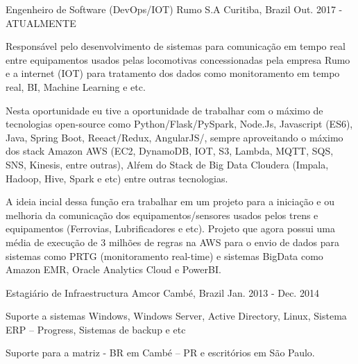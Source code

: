 

\begin{cventries}
\cventry
    { Engenheiro de Software (DevOps/IOT)} %
    {Rumo S.A} %
    {Curitiba, Brazil} %
    {Out. 2017 - ATUALMENTE} %
    {
    \begin{cvitems} %
        \item {
Responsável pelo desenvolvimento de sistemas para comunicação em tempo real entre equipamentos usados pelas locomotivas concessionadas pela empresa Rumo e a internet (IOT) para tratamento dos dados como monitoramento em tempo real, BI, Machine Learning e etc.
}
       \item {Nesta oportunidade eu tive a oportunidade de trabalhar com o máximo de tecnologias open-source como Python/Flask/PySpark, Node.Js, Javascript (ES6), Java, Spring Boot, Reeact/Redux, AngularJS/, sempre aproveitando o máximo dos stack Amazon AWS (EC2, DynamoDB, IOT, S3, Lambda, MQTT, SQS, SNS, Kinesis, entre outras), Alŕem do Stack de Big Data Cloudera (Impala, Hadoop, Hive, Spark e etc) entre outras tecnologias. }
\item{ A ideia incial dessa função era trabalhar em um projeto para a iniciação e ou melhoria  da comunicação dos  equipamentos/sensores usados pelos trens e equipamentos (Ferrovias, Lubrificadores e etc). Projeto que agora possui uma média de execução de 3 milhões de regras na AWS  para o envio de dados para sistemas como PRTG (monitoramento real-time) e sistemas BigData como  Amazon EMR, Oracle Analytics Cloud e PowerBI.}
      \end{cvitems}
    }

  \cventry
    {Estagiário de Infraestructura} %
    {Amcor} %
    {Cambé, Brazil} %
    {Jan. 2013 - Dec. 2014} %
    {
      \begin{cvitems} %
        \item {Suporte a sistemas Windows, Windows Server, Active Directory, Linux, Sistema ERP – Progress, Sistemas de backup e etc}
        \item {Suporte para a matriz - BR em Cambé – PR e escritórios em São Paulo.}
      \end{cvitems}
    }

\end{cventries}
